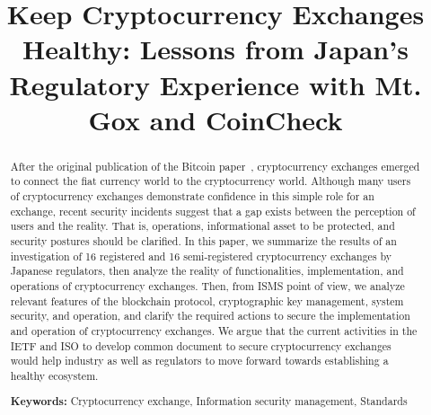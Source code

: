 \documentclass[english]{llncs}
\title{Keep Cryptocurrency Exchanges Healthy: Lessons from Japan's Regulatory Experience with Mt. Gox and CoinCheck}
\begin{document}
\maketitle

\begin{abstract}
After the original publication of the Bitcoin paper~\cite{N08}, cryptocurrency exchanges emerged to connect the fiat currency world to the cryptocurrency world.
Although many users of cryptocurrency exchanges demonstrate confidence in this simple role for an exchange, recent security incidents suggest that a gap
exists
between the perception of users and the reality.
That is, operations, informational asset to be protected, and security postures should be clarified.
In this paper, we summarize the results of an investigation of 16 registered and 16
semi-registered
cryptocurrency exchanges by Japanese regulators, then analyze the reality of functionalities, implementation, and operations of
cryptocurrency exchanges. Then,
from
ISMS
point of view, we analyze relevant features of the blockchain protocol, cryptographic key management, system security, and operation, and clarify the required actions to secure the implementation and operation of cryptocurrency exchanges. We argue that the current activities in the IETF and ISO to develop
common document
to secure
cryptocurrency exchanges would help industry as well as regulators to move forward towards establishing a healthy ecosystem.


{\bf Keywords:} Cryptocurrency exchange, Information security management, Standards
\end{abstract}







\end{document}
